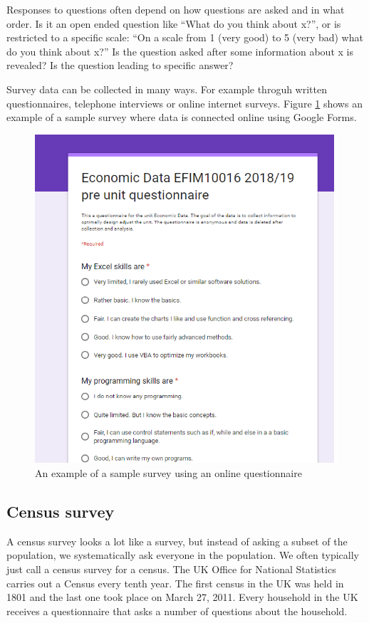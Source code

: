 \documentclass[]{book}
\begin{document}
Responses to questions often depend on how questions are asked and in what order. Is it an open ended question like ``What do you think about x?'', or is restricted to a specific scale: ``On a scale from 1 (very good) to 5 (very bad) what do you think about x?'' Is the question asked after some information about x is revealed? Is the question leading to specific answer?

Survey data can be collected in many ways. For example throguh written questionnaires, telephone interviews or online internet surveys. Figure \ref{fig:source1} shows an example of a sample survey where data is connected online using Google Forms.

\begin{figure}

{\centering \includegraphics[width=0.6\linewidth]{_resources/chapter_sources/fig_survey} 

}

\caption{An example of a sample survey using an online questionnaire}\label{fig:source1}
\end{figure}

\hypertarget{census-survey}{%
\subsection{Census survey}\label{census-survey}}

A census survey looks a lot like a survey, but instead of asking a subset of the population, we systematically ask everyone in the population. We often typically just call a census survey for a census. The UK Office for National Statistics carries out a Census every tenth year. The first census in the UK was held in 1801 and the last one took place on March 27, 2011. Every household in the UK receives a questionnaire that asks a number of questions about the household.
\end{document}
